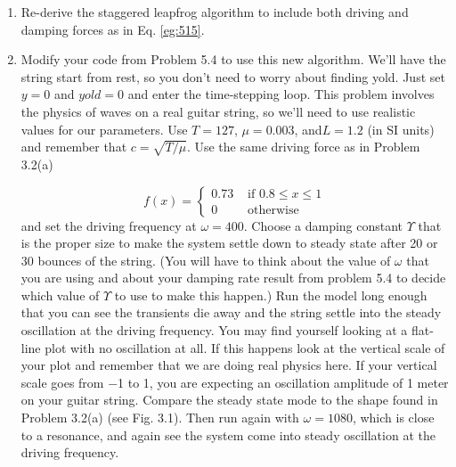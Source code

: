 \documentclass{book}
\theoremstyle{plain}
\theoremstyle{definition}
\numberwithin{exm}{chapter}
\theoremstyle{remark}
\theoremstyle{summary}
\theoremstyle{overview}
\begin{document}
\begin{enumerate}[label=(\alph*)]
\item Re-derive the staggered leapfrog algorithm to include both driving
and damping forces as in Eq. \eqref{eg:515}.
\item Modify your code from Problem 5.4 to use this new algorithm. We\rq ll
have the string start from rest, so you don\rq t need to worry about finding
yold. Just set $y = 0$ and $yold = 0$ and enter the time-stepping loop.
This problem involves the physics of waves on a real guitar string,
so we\rq ll need to use realistic values for our parameters. Use $T = 127$,
$ \mu = 0.003$, and$ L = 1.2$ (in SI units) and remember that $ c = \sqrt{T / \mu}$. Use the same driving force as in Problem 3.2(a)

\begin{equation}\label{eq:516}
f(x)= \begin{cases}0.73 & \text { if } 0.8 \leq x \leq 1 \\ 0 & \text { otherwise }\end{cases}
\end{equation}
and set the driving frequency at $\omega = 400$. Choose a damping constant
$\Upsilon$ that is the proper size to make the system settle down to steady state
after 20 or 30 bounces of the string. (You will have to think about the
value of  $\omega$ that you are using and about your damping rate result from
problem 5.4 to decide which value of $\Upsilon$ to use to make this happen.)
Run the model long enough that you can see the transients die away
and the string settle into the steady oscillation at the driving frequency.
You may find yourself looking at a flat-line plot with no oscillation at
all. If this happens look at the vertical scale of your plot and remember
that we are doing real physics here. If your vertical scale goes from −1
to 1, you are expecting an oscillation amplitude of 1 meter on your
guitar string. Compare the steady state mode to the shape found in
Problem 3.2(a) (see Fig. 3.1).
Then run again with $ \omega = 1080 $, which is close to a resonance, and again
see the system come into steady oscillation at the driving frequency.
\end{enumerate}
\end{document}
